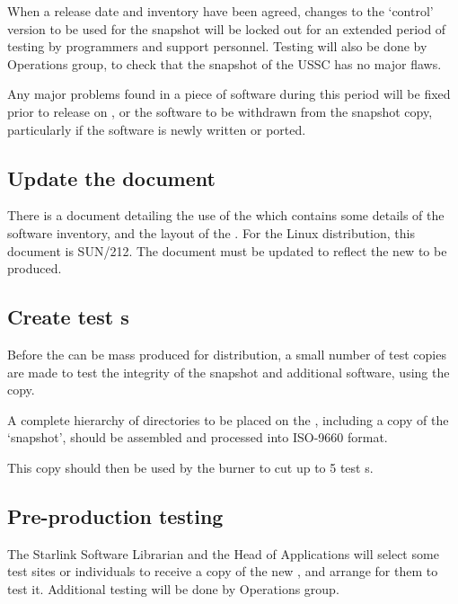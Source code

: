 \documentclass[twoside,11pt]{article}
\newcommand{\xref}[3]{#1}
\newcommand{\xlabel}[1]{}
\begin{document}
When a release date and inventory have been agreed, changes to the
`control' version to be used for the snapshot will be locked out for an
extended period of testing by programmers and support personnel.  Testing
will also be done by Operations group, to check that the snapshot of
the USSC has no major flaws.

Any major problems found in a piece of software during this period will
be fixed prior to release on {}, or the software to be
withdrawn from the snapshot copy, particularly if the software is newly
written or ported.

\subsection{\label{update_the_cdrom_document}\xlabel{update_the_cdrom_document}Update the {} document}

There is a document detailing the use of the {} which
contains some details of the software inventory, and the layout of the
{}.  For the Linux distribution, this document is 
\xref{SUN/212}{sun212}{}. The document must be updated to reflect the
new {} to be produced.

\subsection{\label{create_test_cdroms}\xlabel{create_test_cdroms}Create test {}s}

Before the {} can be mass produced for distribution, a small
number of test copies are made to test the integrity of the snapshot
and additional software, using the {} copy.

A complete hierarchy of directories to be placed on the {},
including a copy of the `snapshot', should be assembled and processed
into ISO-9660 format.

This copy should then be used by the {} burner to cut up to 5
test {}s.

\subsection{\label{pre-production_testing}\xlabel{pre-production_testing}Pre-production testing}

The Starlink Software Librarian and the Head of Applications will
select some test sites or individuals to receive a copy of the new
{}, and arrange for them to test it.
Additional testing will be done by Operations group.
\end{document}
